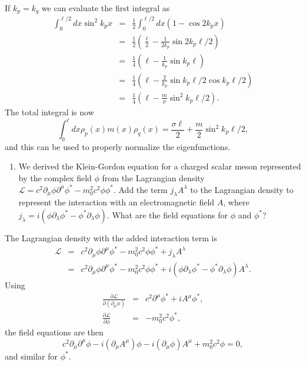 \documentclass[letterpaper,11pt]{article}
\begin{document}
If $k_p = k_q$ we can evaluate the first integral as
\begin{eqnarray*}
 \int_0^{\ell/2} dx \sin^2 k_p x & = & \frac{1}{2} \int_0^{\ell/2} dx ( 1 - \cos 2 k_p x) \\
 & = & \frac{1}{2} \left( \frac{\ell}{2} - \frac{1}{2 k_p} \sin 2 k_p \ell/2 \right) \\
 & = & \frac{1}{4} \left( \ell - \frac{1}{k_p} \sin k_p \ell \right) \\
 & = & \frac{1}{4} \left( \ell - \frac{2}{k_p} \sin k_p \ell/2 \cos k_p \ell/2 \right) \\
 & = & \frac{1}{4} \left( \ell - \frac{m}{\sigma} \sin^2 k_p \ell/2 \right).
\end{eqnarray*}
The total integral is now
\begin{equation*}
 \int_0^\ell dx \rho_p(x) m(x) \rho_q(x) = \frac{\sigma \ell}{2} + \frac{m}{2} \sin^2 k_p \ell/2,
\end{equation*}
and this can be used to properly normalize the eigenfunctions.


\begin{enumerate}[resume]
 \item We derived the Klein-Gordon equation for a charged scalar meson represented by the complex field $\phi$ from the Lagrangian density $\mathcal{L} = c^2 \partial_\mu \phi \partial^\mu \phi^* - m_0^2 c^2 \phi \phi^*$.  Add the term $j_\lambda A^\lambda$ to the Lagrangian density to represent the interaction with an electromagnetic field $A$, where $j_\lambda = i(\phi \partial_\lambda \phi^* - \phi^* \partial_\lambda \phi)$.  What are the field equations for $\phi$ and $\phi^*$?
\end{enumerate}

The Lagrangian density with the added interaction term is
\begin{eqnarray*}
 \mathcal{L} & = & c^2 \partial_\mu \phi \partial^\mu \phi^* - m_0^2 c^2 \phi \phi^* + j_\lambda A^\lambda \\
 & = & c^2 \partial_\mu \phi \partial^\mu \phi^* - m_0^2 c^2 \phi \phi^* + i(\phi \partial_\lambda \phi^* - \phi^* \partial_\lambda \phi) A^\lambda.
\end{eqnarray*}
Using
\begin{eqnarray*}
 \frac{\partial \mathcal{L}}{\partial(\partial_\mu\phi)} & = & c^2 \partial^\mu \phi^* + i A^\mu \phi^*, \\
 \frac{\partial \mathcal{L}}{\partial \phi} & = & - m_0^2 c^2 \phi^*,
\end{eqnarray*}
the field equations are then
\begin{equation*}
 c^2 \partial_\mu \partial^\mu \phi - i (\partial_\mu A^\mu) \phi - i (\partial_\mu \phi) A^\mu + m_0^2 c^2 \phi = 0,
\end{equation*}
and similar for $\phi^*$.
\end{document}
